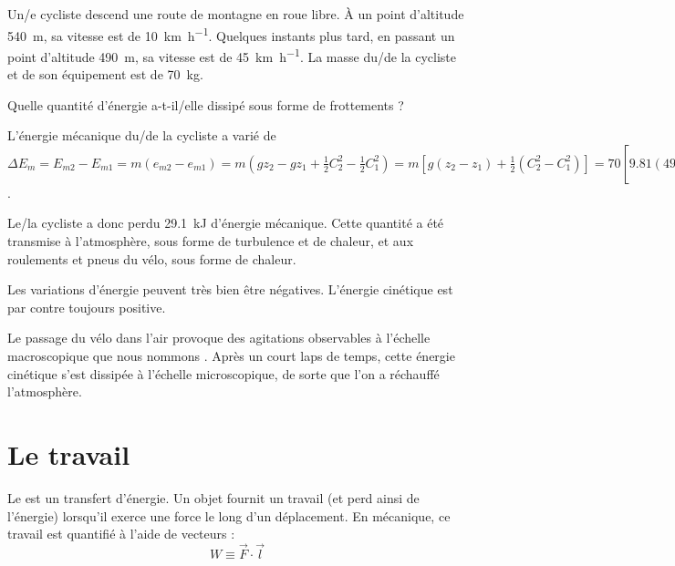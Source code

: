 		\begin{anexample}
			Un/e cycliste descend une route de montagne en roue libre. À un point d’altitude \SI{540}{\metre}, sa vitesse est de \SI[per-mode = symbol]{10}{\kilo\metre\per\hour}. Quelques instants plus tard, en passant un point d’altitude \SI{490}{\metre}, sa vitesse est de \SI[per-mode = symbol]{45}{\kilo\metre\per\hour}. La masse du/de la cycliste et de son équipement est de \SI{70}{\kilogram}.
			
			Quelle quantité d’énergie a-t-il/elle dissipé sous forme de frottements ?
			
				\begin{answer}
					L’énergie mécanique du/de la cycliste a varié de $\Delta E_m = E_{m 2} - E_{m 1} = m (e_{m 2} - e_{m 1}) = m (g z_2 - g z_1 + \frac{1}{2} C_2^2 - \frac{1}{2} C_1^2) =  m \left[ g (z_2 - z_1) + \frac{1}{2} (C_2^2 - C_1^2)\right] = 70 \left[ \num{9,81} (490 - 540) + \frac{1}{2} \left( \left(\frac{\num{45e3}}{\num{3600}}\right)^2 - \left(\frac{\num{10e3}}{\num{3600}}\right)^2\right) \right] = 70 \left[ \num{-490,5} + \num{74,3} \right] = \SI{-2,91e4}{\joule} = \SI{-29,1}{\kilo\joule}$.
					
					Le/la cycliste a donc perdu \SI{29,1}{\kilo\joule} d’énergie mécanique. Cette quantité a été transmise à l’atmosphère, sous forme de turbulence et de chaleur, et aux roulements et pneus du vélo, sous forme de chaleur.
						\begin{remark}Les variations d’énergie peuvent très bien être négatives. L’énergie cinétique est par contre toujours positive. \end{remark}
						\begin{remark}Le passage du vélo dans l’air provoque des agitations observables à l’échelle macroscopique que nous nommons . Après un court laps de temps, cette énergie cinétique s’est dissipée à l’échelle microscopique, de sorte que l’on a réchauffé l’atmosphère. \end{remark}
				\end{answer}
		\end{anexample}



\section{Le travail}
\label{ch_travail_fdl}

	Le  est un transfert d’énergie. Un objet fournit un travail (et perd ainsi de l’énergie) lorsqu’il exerce une force le long d’un déplacement. En mécanique, ce travail est quantifié à l’aide de vecteurs :
	\begin{equation}
		W \equiv \vec F \cdot \vec l
		\label{def_travail}
	\end{equation}

